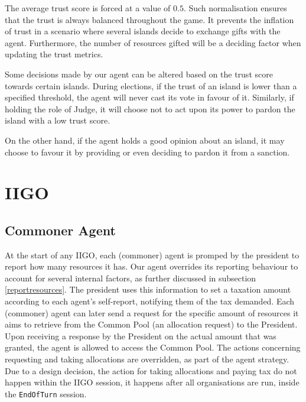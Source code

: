 The average trust score is forced at a value of $0.5$. Such normalisation ensures that the trust is always balanced throughout the game. It prevents the inflation of trust in a scenario where several islands decide to exchange gifts with the agent. Furthermore, the number of resources gifted will be a deciding factor when updating the trust metrics.

Some decisions made by our agent can be altered based on the trust score towards certain islands. During elections, if the trust of an island is lower than a specified threshold, the agent will never cast its vote in favour of it. Similarly, if holding the role of Judge, it will choose not to act upon its power to pardon the island with a low trust score.

On the other hand, if the agent holds a good opinion about an island, it may choose to favour it by providing or even deciding to  pardon it from a sanction.


\section{IIGO}
\subsection{Commoner Agent} \label{commoneragent}
At the start of any IIGO, each (commoner) agent is promped by the president to report how many resources it has. Our agent overrides its reporting behaviour to account for several internal factors, as further discussed in subsection \ref{reportresources}. The president uses this information to set a taxation amount according to each agent's self-report, notifying them of the tax demanded. Each (commoner) agent can later send a request for the specific amount of resources it aims to retrieve from the Common Pool (an allocation request) to the President. Upon receiving a response by the President on the actual amount that was granted, the agent is allowed to access the Common Pool. The actions concerning requesting and taking allocations are overridden, as part of the agent strategy. Due to a design decision, the action for taking allocations and paying tax do not happen within the IIGO session, it happens after all organisations are run, inside the \texttt{EndOfTurn} session.

